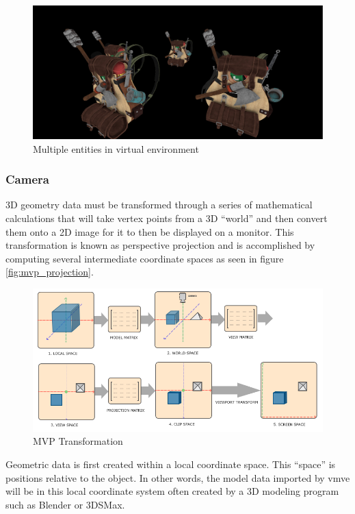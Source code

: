 \documentclass[11pt]{article}
\begin{document}
\begin{figure}[H]
  \centering
  \includegraphics[width=\textwidth]{images/entities.png}
  \caption{Multiple entities in virtual environment}
  \label{fig:entities}
\end{figure}

\subsubsection{Camera} \label{camera}
3D geometry data must be transformed through a series of mathematical
calculations that will take vertex points from a 3D ``world'' and then convert
them onto a 2D image for it to then be displayed on a monitor. This
transformation is known as perspective projection \cite{3d_projection} and is
accomplished by computing several intermediate coordinate spaces as seen in
figure \ref{fig:mvp_projection}.

\begin{figure}[H]
  \centering
  \includegraphics[width=\textwidth]{images/mvp.png}
  \caption{MVP Transformation \cite{coordinate_systems}}
  \label{fig:mvp_transformation} 
\end{figure}

Geometric data is first created within a local coordinate space. This ``space''
is positions relative to the object. In other words, the model data imported by
\gls*{vmve} will be in this local coordinate system often created by a 3D modeling
program such as Blender or 3DSMax.
\end{document}
